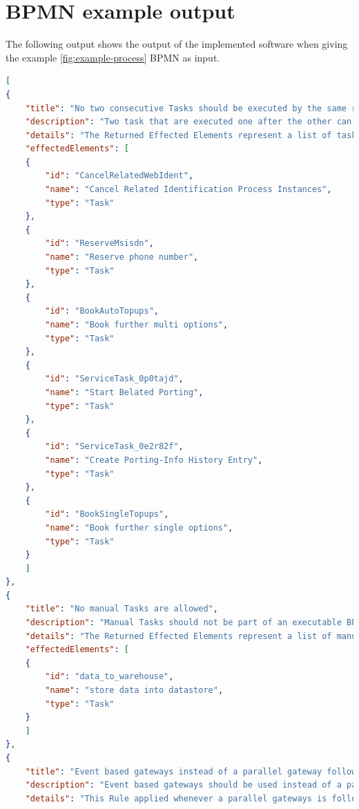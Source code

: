 \section{BPMN example output}\label{app-output}
The following output shows the output of the implemented software when giving the example \ref{fig:example-process} BPMN as input.
\begin{lstlisting}[breaklines=true, language=json]
[
{
	"title": "No two consecutive Tasks should be executed by the same resource",
	"description": "Two task that are executed one after the other can be merged if they have the same enitity executing the Task. In case of User tasks this means the same usergroup is executing this task. Automated Tasks that follow each other should also always be merged to minimize flownodes.",
	"details": "The Returned Effected Elements represent a list of tasks that can be merged with its direct successor.In case that three or more tasks can be merged, this algorithm will return every Task that can be mergedwith its successor on its own. Therefore if \"task1\" , \"task2\" and \"task3\" can be merged all together, this algorithm will \"task2\" and \"task3\" as effected elements",
	"effectedElements": [
	{
		"id": "CancelRelatedWebIdent",
		"name": "Cancel Related Identification Process Instances",
		"type": "Task"
	},
	{
		"id": "ReserveMsisdn",
		"name": "Reserve phone number",
		"type": "Task"
	},
	{
		"id": "BookAutoTopups",
		"name": "Book further multi options",
		"type": "Task"
	},
	{
		"id": "ServiceTask_0p0tajd",
		"name": "Start Belated Porting",
		"type": "Task"
	},
	{
		"id": "ServiceTask_0e2r82f",
		"name": "Create Porting-Info History Entry",
		"type": "Task"
	},
	{
		"id": "BookSingleTopups",
		"name": "Book further single options",
		"type": "Task"
	}
	]
},
{
	"title": "No manual Tasks are allowed",
	"description": "Manual Tasks should not be part of an executable BPMN diagram",
	"details": "The Returned Effected Elements represent a list of manual tasks in the given diagram",
	"effectedElements": [
	{
		"id": "data_to_warehouse",
		"name": "store data into datastore",
		"type": "Task"
	}
	]
},
{
	"title": "Event based gateways instead of a parallel gateway followed by exclusive gateways",
	"description": "Event based gateways should be used instead of a parallel gateway followed by one or more exclusive gateways",
	"details": "This Rule applied whenever a parallel gateways is followed by one or more exclusive gateways. The returned Effected Elements are a list of parallel gateways that are followed by one or more exclusive gateways in the given diagram",

\end{lstlisting}
